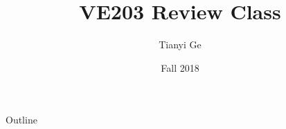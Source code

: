 \documentclass{beamer}
\begin{document}
\title{VE203 Review Class}
\institute[FA2018 VE203]{}
\author{Tianyi Ge}
\date{Fall 2018}
\maketitle

\begin{frame}{Outline}
    \tableofcontents
\end{frame}


\end{document}
